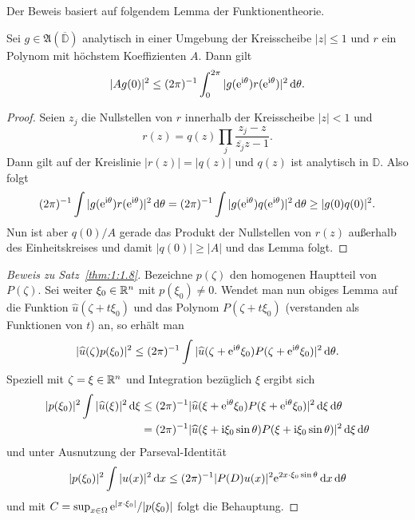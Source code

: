 Der Beweis basiert auf folgendem Lemma der Funktionentheorie. 
\begin{lem}
Sei $g\in\mathfrak A(\overline{\mathbb D})$ analytisch in einer Umgebung der Kreisscheibe $|z|\le 1$  und $r$ ein Polynom mit höchstem Koeffizienten $A$. Dann gilt
\begin{equation}
   |Ag(0)|^2 \le (2\pi)^{-1} \int_0^{2\pi} |g(\mathrm e^{\mathrm i\theta}) r(\mathrm e^{\mathrm i\theta})|^2 \,\mathrm d\theta.
\end{equation}
\end{lem}
\begin{proof}
Seien $z_j$ die Nullstellen von $r$ innerhalb der Kreisscheibe $|z|<1$ und
\begin{equation}
    r(z) = q(z) \prod_{j} \frac{z_j-z}{\overline{z_j}z-1}.
\end{equation} 
Dann gilt auf der Kreislinie $|r(z)|=|q(z)|$ und $q(z)$ ist analytisch in $\mathbb D$. Also folgt
\begin{equation}
  (2\pi)^{-1} \int  |g(\mathrm e^{\mathrm i\theta}) r(\mathrm e^{\mathrm i\theta})|^2 \,\mathrm d\theta = (2\pi)^{-1} \int  |g(\mathrm e^{\mathrm i\theta}) q(\mathrm e^{\mathrm i\theta})|^2 \,\mathrm d\theta \ge |g(0)q(0)|^2.
\end{equation}
Nun ist aber $q(0)/A$ gerade das Produkt der Nullstellen von $r(z)$ außerhalb des Einheitskreises und damit $|q(0)|\ge |A|$ und das Lemma folgt.
\end{proof}

\begin{proof}[Beweis zu Satz~\ref{thm:1:1.8}]
Bezeichne $p(\zeta)$ den homogenen Hauptteil von $P(\zeta)$. Sei weiter $\xi_0\in\mathbb R^n$ mit $p(\xi_0)\ne0$. Wendet man nun obiges Lemma auf die Funktion
$\widehat u(\zeta+ t\xi_0)$ und das Polynom $P(\zeta+t\xi_0)$ (verstanden als Funktionen von $t$) an, so erhält man
\begin{equation}
   |\widehat u(\zeta) p(\xi_0)|^2 \le (2\pi)^{-1} \int |\widehat u(\zeta+\mathrm e^{\mathrm i\theta} \xi_0) P(\zeta+\mathrm e^{\mathrm i\theta}\xi_0)|^2 \,\mathrm d\theta.
\end{equation}
Speziell mit $\zeta=\xi\in\mathbb R^n$ und Integration bezüglich $\xi$ ergibt sich
\begin{align}
   |p(\xi_0)|^2 \int |\widehat u(\xi)|^2 \,\mathrm d\xi &\le (2\pi)^{-1} \relax |\widehat u(\xi+\mathrm e^{\mathrm i\theta}\xi_0) P(\xi+\mathrm e^{\mathrm i\theta}\xi_0)|^2 \,\mathrm d\xi\,\mathrm d\theta \notag\\
   &= (2\pi)^{-1} \relax |\widehat u(\xi+\mathrm i\xi_0\sin\theta) P(\xi+\mathrm i\xi_0\sin\theta)|^2 \,\mathrm d\xi\,\mathrm d\theta
\end{align} 
und unter Ausnutzung der Parseval-Identität
\begin{equation}
   |p(\xi_0)|^2 \int |u(x)|^2\,\mathrm d x \le (2\pi)^{-1} \relax |P(D) u(x)|^2 \mathrm e^{2x\cdot\xi_0 \sin\theta} \,\mathrm d x\,\mathrm d\theta
\end{equation}
und mit $C=\sup_{x\in\Omega} \mathrm e^{|x\cdot\xi_0|} /|p(\xi_0)|$ folgt die Behauptung.
\end{proof}

